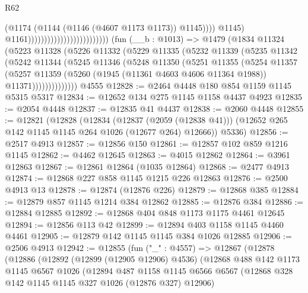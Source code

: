 \begin{lexlean}{R62}
\begin{coremodule}
                                                            (@1174
                                                              (@1144
                                                                (@1146 (@4607 @1173 @1173))
                                                                @1145))))
                                                        @1145)
                                                      @1161)))))))))))))))))))))))))
    (fun (__b : @1013) =>
    @1479
      (@1834
        @11324
        (@5223
          @11328
          (@5226
            @11332
            (@5229
              @11335
              (@5232
                @11339
                (@5235
                  @11342
                  (@5242
                    @11344
                    (@5245
                      @11346
                      (@5248
                        @11350
                        (@5251
                          @11355
                          (@5254
                            @11357
                            (@5257
                              @11359
                              (@5260 (@1945 (@11361 @4603 @4606 @11364 @1988)) @11371))))))))))))))
    @4555
@12828 := @2464 @4448 @180 @854 @1159 @1145 @5315 @5317
@12834 := @12652 @134 @275 @1145 @1158 @4437 @4923
@12835 := @2054 @4448
@12837 := @12835 @41 @4437
@12838 := @2060 @4448
@12855 := @12821
    (@12828
      (@12834
        (@12837 (@2059 (@12838 @41)))
        (@12652 @265 @142 @1145 @1145 @264 @1026 (@12677 @264) @12666))
      @5336)
@12856 := @2517 @4913
@12857 := @12856 @150
@12861 := @12857 @102 @859 @1216 @1145
@12862 := @4462 @12645
@12863 := @4015 @12862
@12864 := @3961 @12863
@12867 := @12861 @12864 (@1035 @12864)
@12868 := @2477 @4913
@12874 := @12868 @227 @858 @1145 @1215 @226 @12863
@12876 := @2500 @4913 @13
@12878 := @12874 (@12876 @226)
@12879 := @12868 @385
@12884 := @12879 @857 @1145 @1214 @384 @12862
@12885 := @12876 @384
@12886 := @12884 @12885
@12892 := @12868 @404 @848 @1173 @1175 @4461 @12645
@12894 := @12856 @113 @42
@12899 := @12894 @403 @1158 @1145 @4460 @4461
@12905 := @12879 @142 @1145 @1145 @384 @1026 @12885
@12906 := @2506 @4913
@12942 := @12855
    (fun ("_" : @4557) =>
    @12867
      (@12878
        (@12886
          (@12892
            (@12899 (@12905 @12906) @4536)
            (@12868
              @488
              @142
              @1173
              @1145
              @6567
              @1026
              (@12894
                @487
                @1158
                @1145
                @6566
                @6567
                (@12868 @328 @142 @1145 @1145 @327 @1026 (@12876 @327) @12906)

\end{coremodule}
\end{lexlean}
